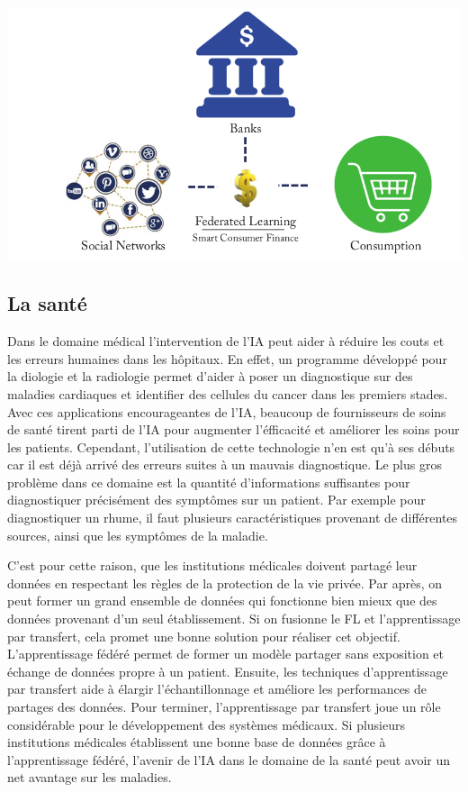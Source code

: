 \documentclass[12pt,a4paper]{report}
\begin{document}
\begin{center}
	\includegraphics[scale=0.2]{finances}
	\label{fig1}
\end{center}

\subsection{La santé}

Dans le domaine médical l'intervention de l'IA peut aider à réduire les couts et les erreurs humaines dans les hôpitaux. En effet, un programme développé pour la diologie et la radiologie permet d'aider à poser un diagnostique sur des maladies cardiaques et identifier des cellules du cancer dans les premiers stades. Avec ces applications encourageantes de l'IA, beaucoup de fournisseurs de soins de santé tirent parti de l'IA pour augmenter l'éfficacité et améliorer les soins pour les patients. Cependant, l'utilisation de cette technologie n'en est qu'à ses débuts car il est déjà arrivé des erreurs suites à un mauvais diagnostique. Le plus gros problème dans ce domaine est la quantité d'informations suffisantes pour diagnostiquer précisément des symptômes sur un patient. Par exemple pour diagnostiquer un rhume, il faut plusieurs caractéristiques provenant de différentes sources, ainsi que les symptômes de la maladie.

C'est pour cette raison, que les institutions médicales doivent partagé leur données en respectant les règles de la protection de la vie privée. Par après, on peut former un grand ensemble de données qui fonctionne bien mieux que des données provenant d'un seul établissement. Si on fusionne le FL et l'apprentissage par transfert, cela promet une bonne solution pour réaliser cet objectif. L'apprentissage fédéré permet de former un modèle partager sans exposition et échange de données propre à un patient. Ensuite, les techniques d'apprentissage par transfert aide à élargir l'échantillonnage et améliore les performances de partages des données. Pour terminer, l'apprentissage par transfert joue un rôle considérable pour le développement des systèmes médicaux. Si plusieurs institutions médicales établissent une bonne base de données grâce à l'apprentissage fédéré, l'avenir de l'IA dans le domaine de la santé peut avoir un net avantage sur les maladies. 
\end{document}

